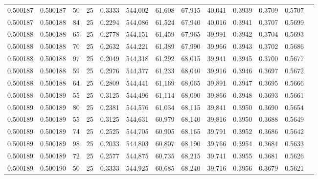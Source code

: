 \begin{tabular}{rrrrrrrrrrrrr}
0.500187 & 0.500187 &    50 &  25 &                                     0.3333 & 544,002 &  61,608 &  67,915 &  40,041 & 0.3939 & 0.3709 & 0.5707 \\
0.500187 & 0.500188 &    84 &  25 &                                     0.2294 & 544,086 &  61,524 &  67,940 &  40,016 & 0.3941 & 0.3707 & 0.5699 \\
0.500188 & 0.500188 &    65 &  25 &                                     0.2778 & 544,151 &  61,459 &  67,965 &  39,991 & 0.3942 & 0.3704 & 0.5693 \\
0.500188 & 0.500188 &    70 &  25 &                                     0.2632 & 544,221 &  61,389 &  67,990 &  39,966 & 0.3943 & 0.3702 & 0.5686 \\
0.500188 & 0.500188 &    97 &  25 &                                     0.2049 & 544,318 &  61,292 &  68,015 &  39,941 & 0.3945 & 0.3700 & 0.5677 \\
0.500188 & 0.500188 &    59 &  25 &                                     0.2976 & 544,377 &  61,233 &  68,040 &  39,916 & 0.3946 & 0.3697 & 0.5672 \\
0.500188 & 0.500188 &    64 &  25 &                                     0.2809 & 544,441 &  61,169 &  68,065 &  39,891 & 0.3947 & 0.3695 & 0.5666 \\
0.500188 & 0.500189 &    55 &  25 &                                     0.3125 & 544,496 &  61,114 &  68,090 &  39,866 & 0.3948 & 0.3693 & 0.5661 \\
0.500189 & 0.500189 &    80 &  25 &                                     0.2381 & 544,576 &  61,034 &  68,115 &  39,841 & 0.3950 & 0.3690 & 0.5654 \\
0.500189 & 0.500189 &    55 &  25 &                                     0.3125 & 544,631 &  60,979 &  68,140 &  39,816 & 0.3950 & 0.3688 & 0.5649 \\
0.500189 & 0.500189 &    74 &  25 &                                     0.2525 & 544,705 &  60,905 &  68,165 &  39,791 & 0.3952 & 0.3686 & 0.5642 \\
0.500189 & 0.500189 &    98 &  25 &                                     0.2033 & 544,803 &  60,807 &  68,190 &  39,766 & 0.3954 & 0.3684 & 0.5633 \\
0.500189 & 0.500189 &    72 &  25 &                                     0.2577 & 544,875 &  60,735 &  68,215 &  39,741 & 0.3955 & 0.3681 & 0.5626 \\
0.500189 & 0.500190 &    50 &  25 &                                     0.3333 & 544,925 &  60,685 &  68,240 &  39,716 & 0.3956 & 0.3679 & 0.5621 \\

\end{tabular}

